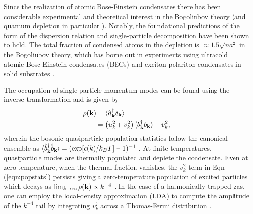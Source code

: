 	Since the realization of atomic Bose-Einstein condensates there has been considerable experimental \cite{Stewart10,Wild12,Chang16,Makotyn14,Eigen18,Xu06,Vogels02,Pieczarka20,Lopes17_depletion,Cayla20,Kuhnle11,Sagi12,Fletcher17,Lopes17_quasiparticle,Mukherjee19,Carcy19} and 
	theoretical \cite{Colussi20,Kira15_coherent,Decamp18,Smith14,Qu16,Braaten10,Braaten11,Rakhimov20,Braaten08,Zhang09,Combescot09,Werner12_boson,Werner12_fermion,Sinatra00,Deuar11} interest in the 	Bogoliubov theory \cite{Vogels02,Steinhauer03,Lopes17_quasiparticle,Sinatra00,Deuar11} (and quantum depletion in particular \cite{Lopes17_depletion,Chang16,Xu06,Pieczarka20,Cayla20}).
	Notably, the foundational predictions of  the form of the dispersion relation \cite{Steinhauer03} and single-particle decomposition \cite{Vogels02} have been shown to hold.
	The total fraction of condensed atoms in the depletion is $\approx 1.5\sqrt{n a^3}$ \cite{Bogoliubov47} in the Bogoliubov theory, which has borne out in experiments using ultracold atomic Bose-Einstein condensates (BECs) \cite{Xu06,Lopes17_depletion} and exciton-polariton condensates in solid substrates \cite{Pieczarka20}.
	

	The occupation of single-particle momentum modes can be found using the inverse transformation and is given by
	 \begin{align}
	 \rho(\textbf{k}) &= \langle\hat{a}_{\textbf{k}}^\dagger\hat{a}_{\textbf{k}}\rangle\\
		 &=\left(u_{k}^{2}+v_{k}^{2}\right)\langle b_{\textbf{k}}^{\dagger}b_{\textbf{k}}\rangle + v_{k}^{2},
		 \label{eqn:popstats}
	 \end{align}
	wherein the bosonic quasiparticle population statistics follow the canonical ensemble as $\langle \hat{b}^\dagger_{\textbf{k}}\hat{b}_{\textbf{k}}\rangle = (\exp[\epsilon(k)/k_B T]-1)^{-1}$ \cite{PitaevskiiStringari,Chang16}. At finite temperatures, quasiparticle modes are thermally populated and deplete the condensate.  Even at zero temperature, when the thermal fraction vanishes, the $v_k^2$ term in Eqn (\ref{eqn:popstats}) persists giving a zero-temperature population of excited %
	{particles \cite{Olshanii03,Decamp18,Chang16}} which decays as $\lim_{k\rightarrow\infty}\rho(\textbf{k})\propto k^{-4}$ \cite{PethickSmith,PitaevskiiStringari,Chang16}. 
	In the case of a harmonically trapped gas, one can employ the local-density approximation (LDA) to compute the amplitude of the $k^{-4}$ tail by  integrating $v_k^2$ across a Thomas-Fermi distribution \cite{Chang16}. 
	
